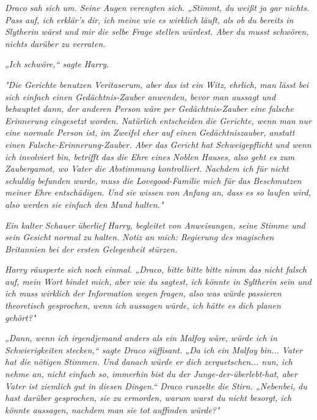 {\emph{Draco sah sich um. Seine Augen verengten sich. „Stimmt, du weißt ja gar nichts. Pass auf, ich erklär's dir, ich meine wie es wirklich läuft, als ob du bereits in Slytherin wärst und mir die selbe Frage stellen würdest. Aber du musst schwören, nichts darüber zu verraten.}

\emph{„Ich schwöre,“ sagte Harry.}

\emph{"Die Gerichte benutzen Veritaserum, aber das ist ein Witz, ehrlich, man lässt bei sich einfach einen Gedächtnis-Zauber anwenden, bevor man aussagt und behauptet dann, der anderen Person wäre per Gedächtnis-Zauber eine falsche Erinnerung eingesetzt worden. Natürlich entscheiden die Gerichte, wenn man nur eine normale Person ist, im Zweifel eher auf einen Gedächtniszauber, anstatt einen Falsche-Erinnerung-Zauber. Aber das Gericht hat Schweigepflicht und wenn} \emph{\emph{ich}} \emph{involviert bin, betrifft das die Ehre eines Noblen Hauses, also geht es zum Zaubergamot, wo Vater die Abstimmung kontrolliert. Nachdem ich für nicht schuldig befunden wurde, muss die Lovegood-Familie mich für das Beschmutzen meiner Ehre entschädigen. Und sie wissen von Anfang an, dass es so laufen wird, also werden sie einfach den Mund halten."}

\emph{Ein kalter Schauer überlief Harry, begleitet von Anweisungen, seine Stimme und sein Gesicht normal zu halten.} \emph{\emph{Notiz an mich: Regierung des magischen Britannien bei der ersten Gelegenheit stürzen.}}

\emph{Harry räusperte sich noch einmal. „Draco, bitte bitte} \emph{\emph{bitte}} \emph{nimm das nicht falsch auf, mein Wort bindet mich, aber wie du sagtest, ich könnte in Syltherin sein und ich muss wirklich der Information wegen fragen, also was würde passieren} \emph{\emph{theoretisch gesprochen,}} \emph{wenn ich aussagen} \emph{\emph{würde,}} \emph{ich hätte es dich planen gehört?"}

\emph{„Dann, wenn ich irgendjemand anders als ein Malfoy wäre, würde ich in Schwierigkeiten stecken,“ sagte Draco süffisant. „Da ich ein Malfoy} \emph{\emph{bin...}} \emph{Vater hat die nötigen Stimmen. Und danach würde er dich zerquetschen... nun, ich nehme an, nicht einfach so, immerhin} \emph{\emph{bist}} \emph{du der Junge-der-überlebt-hat, aber Vater ist ziemlich gut in diesen Dingen.“ Draco runzelte die Stirn. „Nebenbei,} \emph{\emph{du}} \emph{hast darüber gesprochen, sie zu ermorden, warum warst du nicht besorgt,} \emph{\emph{ich}} \emph{könnte aussagen, nachdem man sie tot auffinden würde?"}

}
